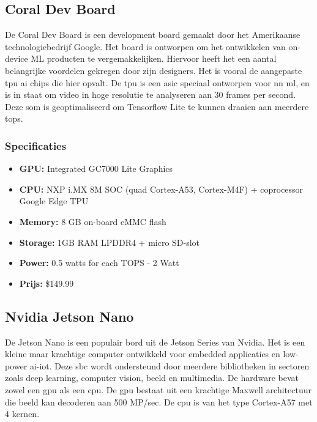 	
	\subsection{Coral Dev Board}
	De Coral Dev Board is een development board gemaakt door het Amerikaanse technologiebedrijf Google\citep{bron:coraldev}. Het board is ontworpen om het ontwikkelen van on-device ML producten te vergemakkelijken. Hiervoor heeft het een aantal belangrijke voordelen gekregen door zijn designers. Het is vooral de aangepaste \gls{tpu} \gls{ai} chips die hier opvalt. De \gls{tpu} is een \gls{asic} speciaal ontworpen voor \gls{nn} \gls{ml}, en is in staat om video in hoge resolutie te analyseren aan 30 frames per second. Deze \gls{som} is geoptimaliseerd om Tensorflow Lite te kunnen draaien aan meerdere \gls{tops}.
	
		\subsubsection{Specificaties}
		\begin{itemize}
			\item \textbf{GPU:} Integrated GC7000 Lite Graphics
			\item \textbf{CPU:} NXP i.MX 8M SOC (quad Cortex-A53, Cortex-M4F) + coprocessor Google Edge TPU
			\item \textbf{Memory:} 8 GB on-board eMMC flash
			\item \textbf{Storage:} 1GB RAM LPDDR4 + micro SD-slot
			\item \textbf{Power:} 0.5 watts for each TOPS - 2 Watt
			\item \textbf{Prijs:} \$149.99
		\end{itemize}
	
	
	\subsection{Nvidia Jetson Nano}
	De Jetson Nano is een populair bord uit de Jetson Series van Nvidia\citep{bron:jetsonnano}. Het is een kleine maar krachtige computer ontwikkeld voor embedded applicaties en low-power \gls{ai}-\gls{iot}. Deze \gls{sbc} wordt ondersteund door meerdere bibliotheken in sectoren zoals deep learning, computer vision, beeld en multimedia. De hardware bevat zowel een \gls{gpu} als een \gls{cpu}. De \gls{gpu} bestaat uit een krachtige Maxwell architectuur die beeld kan decoderen aan 500 MP/sec. De \gls{cpu} is van het type Cortex-A57 met 4 kernen.
	
